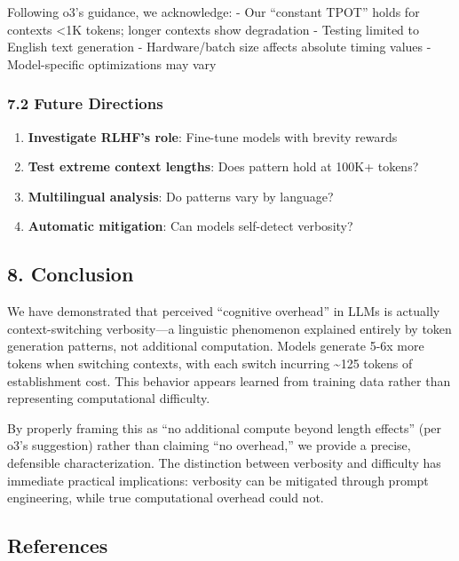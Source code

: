 \documentclass[
  11pt]{article}
\providecommand{\tightlist}{%
  \setlength{\itemsep}{0pt}\setlength{\parskip}{0pt}}
\begin{document}
Following o3's guidance, we acknowledge: - Our ``constant TPOT'' holds
for contexts \textless1K tokens; longer contexts show degradation -
Testing limited to English text generation - Hardware/batch size affects
absolute timing values - Model-specific optimizations may vary

\subsubsection{7.2 Future Directions}\label{future-directions}

\begin{enumerate}
\def\labelenumi{\arabic{enumi}.}
\tightlist
\item
  \textbf{Investigate RLHF's role}: Fine-tune models with brevity
  rewards
\item
  \textbf{Test extreme context lengths}: Does pattern hold at 100K+
  tokens?
\item
  \textbf{Multilingual analysis}: Do patterns vary by language?
\item
  \textbf{Automatic mitigation}: Can models self-detect verbosity?
\end{enumerate}

\subsection{8. Conclusion}\label{conclusion}

We have demonstrated that perceived ``cognitive overhead'' in LLMs is
actually context-switching verbosity---a linguistic phenomenon explained
entirely by token generation patterns, not additional computation.
Models generate 5-6x more tokens when switching contexts, with each
switch incurring \textasciitilde125 tokens of establishment cost. This
behavior appears learned from training data rather than representing
computational difficulty.

By properly framing this as ``no additional compute beyond length
effects'' (per o3's suggestion) rather than claiming ``no overhead,'' we
provide a precise, defensible characterization. The distinction between
verbosity and difficulty has immediate practical implications: verbosity
can be mitigated through prompt engineering, while true computational
overhead could not.

\subsection{References}\label{references}
\end{document}
